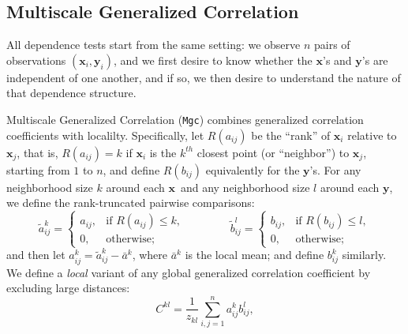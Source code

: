 \documentclass[11pt]{article}
\providecommand{\sct}[1]{{\sc \texttt{#1}}}
\providecommand{\mt}[1]{\widetilde{#1}}
\providecommand{\mb}[1]{\boldsymbol{#1}}
\newcommand{\G}{C}
\newcommand{\Mgc}{\sct{Mgc}}
\newcommand{\mbx}{\ensuremath{\mb{x}}}
\newcommand{\mby}{\ensuremath{\mb{y}}}
\begin{document}


\subsection*{Multiscale Generalized Correlation}
\label{s:mgc}

All dependence tests start from the same setting: we observe $n$ pairs of observations $(\mbx_i,\mby_i)$, and we first desire to know whether the \mbx's and \mby's are independent of one another, and if so, we then desire to understand the nature of that dependence structure.


Multiscale Generalized Correlation (\Mgc) combines generalized correlation coefficients with localilty.
Specifically, let $R(a_{ij})$  be the ``rank'' of $\mbx_i$ relative to $\mbx_j$, that is, $R(a_{ij})=k$ if $\mbx_i$ is the $k^{th}$ closest point (or ``neighbor'') to $\mbx_j$, starting from $1$ to $n$, and  define $R(b_{ij})$ equivalently for the \mby's. For any neighborhood size $k$ around each \mbx~and any neighborhood size $l$ around each \mby, we define the rank-truncated pairwise comparisons:
\begin{equation}
\label{localCoef2}
    \mt{a}_{ij}^k=
    \begin{cases}
      a_{ij}, & \text{if } R(a_{ij}) \leq k, \\
      0, & \text{otherwise};
    \end{cases} \qquad \qquad
    \mt{b}_{ij}^l=
    \begin{cases}
      b_{ij}, & \text{if } R(b_{ij}) \leq l, \\
      0, & \text{otherwise};
    \end{cases}
\end{equation}
and then let $a^k_{ij}=\mt{a}^k_{ij} - \bar{a}^k$, 
where $\bar{a}^k$ is the local mean;
and define $b^k_{ij}$ similarly.
We define a \emph{local} variant of any global generalized correlation coefficient by  excluding large distances: %
\begin{equation}
\label{localCoef}
\G^{kl}=\dfrac{1}{z_{kl}} {\textstyle \sum_{i,j=1}^n a_{ij}^k b_{ij}^l},
\end{equation}
\end{document}
